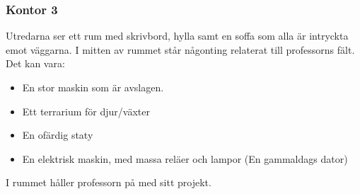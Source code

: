 \subsubsection*{Kontor 3}
Utredarna ser ett rum med skrivbord, hylla samt en soffa som alla är intryckta emot väggarna. I mitten av rummet står någonting relaterat till professorns fält. Det kan vara:
%
\begin{itemize}
	\item En stor maskin som är avslagen.
	\item Ett terrarium för djur/växter
	\item En ofärdig staty
	\item En elektrisk maskin, med massa reläer och lampor (En gammaldags dator)
\end{itemize}

I rummet håller professorn på med sitt projekt.
